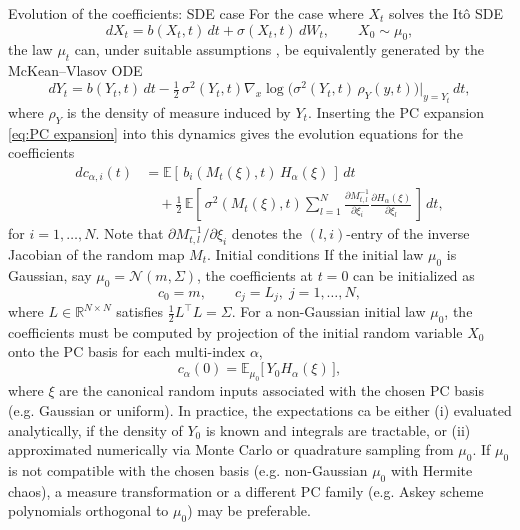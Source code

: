 \documentclass[11pt, a4paper, oneside, reqno]{amsart}
\makeatletter
\def\subsubsection{\@startsection{subsubsection}{3}%
	\z@{.5\linespacing\@plus.7\linespacing}{.5\linespacing}%
	{\normalfont\itshape}}
\makeatother
\begin{document}
\subsubsection{Evolution of the coefficients: SDE case}
\noindent For the case where $X_t$ solves the Itô SDE
\begin{equation}\label{eq:ito}
dX_t = b(X_t,t)\,dt + \sigma(X_t,t)\,dW_t, \qquad X_0 \sim \mu_0,
\end{equation}
the law $\mu_t$ can, under suitable assumptions \cite{gorjichaos}, be equivalently generated by the McKean–Vlasov ODE
\begin{equation}
dY_t = b(Y_t,t)\,dt - \tfrac{1}{2}\,\sigma^2(Y_t,t) 
\nabla_x \log\!\big(\sigma^2(Y_t,t)\,\rho_Y(y,t)\big)\big|_{y=Y_t}\,dt,
\end{equation}
where $\rho_Y$ is the density of measure induced by $Y_t$.
Inserting the PC expansion \eqref{eq:PC expansion} into this dynamics gives the evolution equations for the coefficients
\begin{align}\label{eq:coeff evolution SDE}
dc_{\alpha,i}(t) &= \mathbb{E}\left[\, b_i(M_t(\xi),t)\, H_\alpha(\xi)\,\right]\,dt \\
&\quad+ \tfrac{1}{2}\,\mathbb{E}\left[\, 
\sigma^2(M_t(\xi),t) 
\sum_{l=1}^N \frac{\partial M_{t,l}^{-1}}{\partial \xi_i} 
\frac{\partial H_\alpha(\xi)}{\partial \xi_l}
\,\right]\,dt, \nonumber
\end{align}
for $i=1,\dots,N$.  
Note that ${\partial M_{t,l}^{-1}}/{\partial \xi_i}$ denotes the $(l,i)$-entry of the inverse Jacobian of the random map $M_t$.  
\subsubsection{Initial conditions}
\noindent If the initial law $\mu_0$ is Gaussian, say $\mu_0=\mathcal{N}(m,\Sigma)$, the coefficients at $t=0$ can be initialized as
\[
c_0 = m, 
\qquad c_j = L_j,\; j=1,\dots,N,
\]
where $L\in\mathbb{R}^{N\times N}$ satisfies $\tfrac{1}{2}L^\top L = \Sigma$.  
For a non-Gaussian initial law $\mu_0$, the coefficients must be computed by projection of the initial random variable $X_0$ onto the PC basis for each multi-index $\alpha$, 
\[
c_\alpha(0) = \mathbb{E}_{\mu_0}\big[\, Y_0 H_\alpha(\xi)\,\big],
\]
where $\xi$ are the canonical random inputs associated with the chosen PC basis (e.g. Gaussian or uniform).  
In practice, the expectations ca be either (i) evaluated analytically, if the density of $Y_0$ is known and integrals are tractable, or (ii) approximated numerically via Monte Carlo or quadrature sampling from $\mu_0$.  
If $\mu_0$ is not compatible with the chosen basis (e.g. non-Gaussian $\mu_0$ with Hermite chaos), a measure transformation or a different PC family (e.g. Askey scheme polynomials orthogonal to $\mu_0$) may be preferable.  
\end{document}
